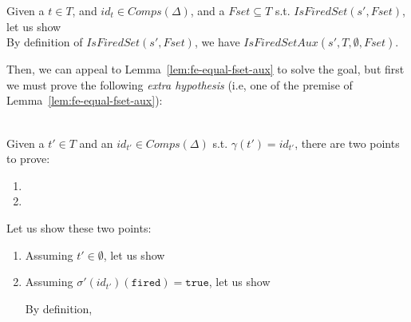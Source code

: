 \documentclass[dvipsnames,12pt]{article}
\begin{document}
\begin{niproof}
  Given a $t\in{}T$, and $id_t\in{}Comps(\Delta)$, and a
  $Fset\subseteq{}T$ s.t. $IsFiredSet(s',Fset)$, let us show
  \\

  By definition of $IsFiredSet(s',Fset)$, we have
  $IsFiredSetAux(s',T,\emptyset,Fset)$.

  Then, we can appeal to Lemma~\ref{lem:fe-equal-fset-aux} to solve
  the goal, but first we must prove the following \emph{extra
    hypothesis} (i.e, one of the premise of
  Lemma~\ref{lem:fe-equal-fset-aux}):

  \\

  Given a $t'\in{}T$ and an $id_{t'}\in{}Comps(\Delta)$
  s.t. $\gamma(t')=id_{t'}$, there are two points to prove:
  \begin{enumerate}
  \item
  \item
  \end{enumerate}

  Let us show these two points:
  \begin{enumerate}
  \item Assuming $t'\in{}\emptyset$, let us show

  \item Assuming $\sigma'(id_{t'})(\texttt{fired})=\mathtt{true}$, let us
    show 

    By definition, 
  \end{enumerate}
  
\end{niproof}

\end{document}
